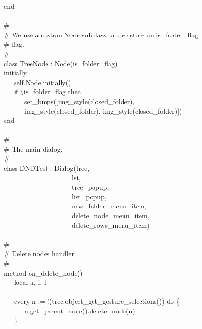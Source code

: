 {end \\
\ \\
\# \\
\# We use a custom Node subclass to also store an
{\textquotedbl}is\_folder\_flag{\textquotedbl} \\
\# flag. \\
\# \\
class TreeNode : Node(is\_folder\_flag) \\
\>   initially \\
\>   \ \ \ self.Node.initially() \\
\>   \ \ \ if {\textbackslash}is\_folder\_flag then \\
\>   \ \ \ \ \ \ set\_bmps([img\_style({\textquotedbl}closed\_folder{\textquotedbl}), \\
\>   \ \ \ \ \ \ img\_style({\textquotedbl}closed\_folder{\textquotedbl}),
img\_style({\textquotedbl}closed\_folder{\textquotedbl})]) \\
end \\
\ \\
\# \\
\# The main dialog. \\
\# \\
class DNDTest : Dialog(tree, \\
\>   \ \ \ \ \ \ \ \ \ \ \ \ \ \ \ \ \ \ \ \ lst,  \\
\>   \ \ \ \ \ \ \ \ \ \ \ \ \ \ \ \ \ \ \ \ tree\_popup,  \\
\>   \ \ \ \ \ \ \ \ \ \ \ \ \ \ \ \ \ \ \ \ list\_popup,  \\
\>   \ \ \ \ \ \ \ \ \ \ \ \ \ \ \ \ \ \ \ \ new\_folder\_menu\_item,  \\
\>   \ \ \ \ \ \ \ \ \ \ \ \ \ \ \ \ \ \ \ \ delete\_node\_menu\_item, \\
\>   \ \ \ \ \ \ \ \ \ \ \ \ \ \ \ \ \ \ \ \ delete\_rows\_menu\_item) \\
\ \\
\>   \# \\
\>   \# Delete nodes handler \\
\>   \# \\
\>   method on\_delete\_node() \\
\>   \ \ \ local n, i, l \\
\ \\
\>   \ \ \ every n := !(tree.object\_get\_gesture\_selections()) do \{ \\
\>   \ \ \ \ \ \ n.get\_parent\_node().delete\_node(n) \\
\>   \ \ \ \} \\
}
